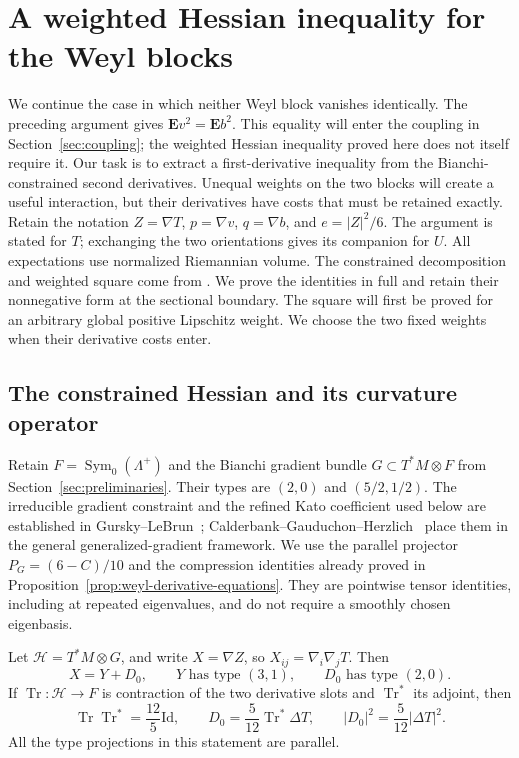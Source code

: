 \section{A weighted Hessian inequality for the Weyl blocks}
\label{sec:hessian}

We continue the case in which neither Weyl block vanishes identically.
The preceding argument gives
\(\mathbf E v^2=\mathbf E b^2\). This equality will enter the coupling
in Section~\ref{sec:coupling}; the weighted Hessian inequality proved here
does not itself require it. Our task is to extract a first-derivative
inequality from the Bianchi-constrained second derivatives. Unequal
weights on the two blocks will create a useful interaction, but their
derivatives have costs that must be retained exactly.
Retain the notation
\(Z=\nabla T\), \(p=\nabla v\), \(q=\nabla b\), and
\(e=|Z|^2/6\).
The argument is stated for $T$; exchanging the two orientations gives
its companion for $U$. All expectations use normalized Riemannian volume.
The constrained decomposition and weighted square come from
\cite[Lemmas~5.1--5.2 and Proposition~5.3]{OpenAI2026P}. We prove the
identities in full and retain their nonnegative form at the sectional
boundary. The square will first be proved for an arbitrary global positive
Lipschitz weight. We choose the two fixed weights when their derivative
costs enter.

\subsection{The constrained Hessian and its curvature operator}

Retain $F=\operatorname{Sym}_0(\Lambda^+)$ and the Bianchi gradient
bundle $G\subset T^*M\otimes F$ from Section~\ref{sec:preliminaries}.
Their types are $(2,0)$ and $(5/2,1/2)$. The irreducible gradient
constraint and the refined Kato coefficient used below are established
in Gursky--LeBrun~\cite[Lemma~4, Equations~(10)--(12)]{GurskyLeBrun1999};
Calderbank--Gauduchon--Herzlich~\cite{CalderbankGauduchonHerzlich2000}
place them in the general generalized-gradient framework. We use the
parallel projector $P_G=(6-C)/10$ and the compression identities already
proved in Proposition~\ref{prop:weyl-derivative-equations}. They are
pointwise tensor identities, including at repeated eigenvalues, and do
not require a smoothly chosen eigenbasis.

\begin{lemma}
\label{lem:hessian-components}
Let \(\mathcal H=T^*M\otimes G\), and write
\(X=\nabla Z\), so \(X_{ij}=\nabla_i\nabla_jT\).
Then
\[
 X=Y+D_0,
 \qquad
 Y\text{ has type }(3,1),\qquad
 D_0\text{ has type }(2,0).
\]
If \(\operatorname{Tr}:\mathcal H\to F\) is contraction of the
two derivative slots and \(\operatorname{Tr}^*\) its adjoint, then
\[
 \operatorname{Tr}\operatorname{Tr}^*=\frac{12}{5}\mathrm{Id},
 \qquad
 D_0=\frac5{12}\operatorname{Tr}^*\Delta T,
 \qquad
 |D_0|^2=\frac5{12}|\Delta T|^2.
\]
All the type projections in this statement are parallel.
\end{lemma}

